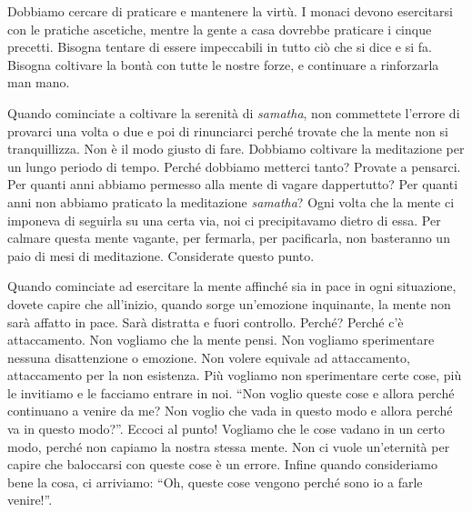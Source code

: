 Dobbiamo cercare di praticare e mantenere la virtù. I monaci devono
esercitarsi con le pratiche ascetiche,%
mentre la
gente a casa dovrebbe praticare i cinque precetti.%
Bisogna tentare di essere impeccabili in tutto ciò che si dice e si fa.
Bisogna coltivare la bontà con tutte le nostre forze, e continuare a
rinforzarla man mano.

Quando cominciate a coltivare la serenità di \emph{samatha}, non commettete
l'errore di provarci una volta o due e poi di rinunciarci perché trovate
che la mente non si tranquillizza. Non è il modo giusto di fare.
Dobbiamo coltivare la meditazione per un lungo periodo di tempo. Perché
dobbiamo metterci tanto? Provate a pensarci. Per quanti anni abbiamo
permesso alla mente di vagare dappertutto? Per quanti anni non abbiamo
praticato la meditazione \emph{samatha}? Ogni volta che la mente ci imponeva di
seguirla su una certa via, noi ci precipitavamo dietro di essa. Per
calmare questa mente vagante, per fermarla, per pacificarla, non
basteranno un paio di mesi di meditazione. Considerate questo punto.

Quando cominciate ad esercitare la mente affinché sia in pace in ogni
situazione, dovete capire che all'inizio, quando sorge un'emozione
inquinante, la mente non sarà affatto in pace. Sarà distratta e fuori
controllo. Perché? Perché c'è attaccamento. Non vogliamo che la mente
pensi. Non vogliamo sperimentare nessuna disattenzione o emozione. Non
volere equivale ad attaccamento, attaccamento per la non esistenza. Più
vogliamo non sperimentare certe cose, più le invitiamo e le facciamo
entrare in noi. ``Non voglio queste cose e allora perché continuano a
venire da me? Non voglio che vada in questo modo e allora perché va in
questo modo?''. Eccoci al punto! Vogliamo che le cose vadano in un certo
modo, perché non capiamo la nostra stessa mente. Non ci vuole
un'eternità per capire che baloccarsi con queste cose è un errore.
Infine quando consideriamo bene la cosa, ci arriviamo: ``Oh, queste cose
vengono perché sono io a farle venire!''.

